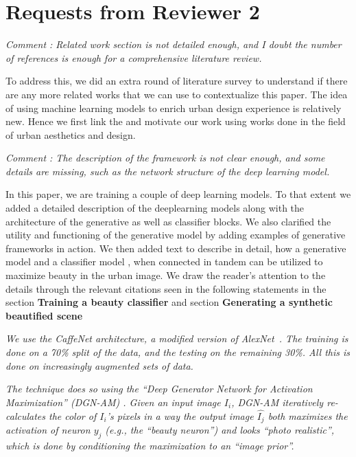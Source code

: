 \documentclass{paper}
\newenvironment{myquote}
{\definecolor{shadecolor}{rgb}{0.9,0.95,1} \begin{shaded*} \sf \em}
{\em\end{shaded*}}
\newenvironment{myquoteOrange}
{\definecolor{shadecolor}{rgb}{1,0.9,0.83} \begin{shaded*} \sf \em}
{\em\end{shaded*}}
\begin{document}
\section*{Requests from Reviewer 2}


\begin{myquote}
\noindent Comment : Related work section is not detailed enough, and I doubt the number of references is enough for a comprehensive literature review.
\end{myquote}
\noindent %
To address this, we did an extra round of literature survey to understand if there are any more related works that we can use to contextualize this paper. 
The idea of using machine learning models to enrich urban design experience is relatively new. Hence we first link the and motivate our work using works done in the field of urban aesthetics and design. 


\begin{myquote}
\noindent Comment : The description of the framework is not clear enough, and some details are missing, such as the network structure of the deep learning model.
\end{myquote}
\noindent %

In this paper, we are training a couple of deep learning models. 
To that extent we added a detailed description of the deeplearning models along with the architecture of the generative as well as classifier blocks. We also clarified the utility and functioning of the generative model by adding examples of generative frameworks in action. We then added text to describe in detail, how a generative model and a classifier model , when connected in tandem can be utilized to maximize beauty in the urban image. 
We draw the reader's attention to the details through the relevant citations seen in the following statements in the section \textbf{ Training a beauty classifier} and section \textbf{Generating a synthetic beautified scene}

\begin{myquoteOrange}
    We use the CaffeNet architecture, a modified version of AlexNet~\cite{krizhevsky2012imagenet,szegedy2015going}. The training is done on a 70\% split of the data, and the testing on the remaining 30\%. All this is done on increasingly augmented sets of data.
\end{myquoteOrange}

\begin{myquoteOrange}
    The technique does so using the ``Deep Generator Network for Activation Maximization'' (\emph{DGN-AM}) \cite{nguyen2016synthesizing}. Given an input image $I_i$, \emph{DGN-AM} iteratively re-calculates the color of $I_i$'s pixels in  a way  the output image $\hat{I_j}$  both maximizes  the  activation of neuron $y_j$ (e.g., the ``beauty neuron'') and looks ``photo realistic'',  which is done by conditioning the maximization to an ``image prior''.
\end{myquoteOrange}
\end{document}
